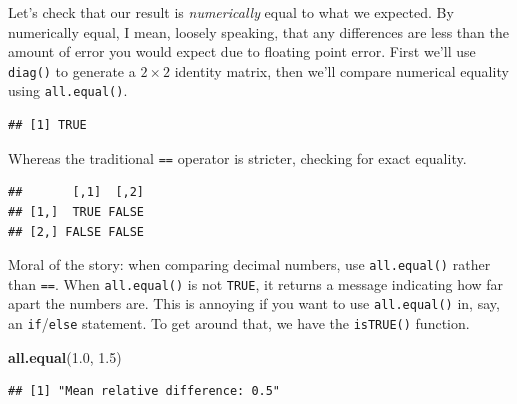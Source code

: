 \documentclass[12pt,oneside,openany]{book}
\newenvironment{Shaded}{\begin{snugshade}}{\end{snugshade}}
\newcommand{\KeywordTok}[1]{\textcolor[rgb]{0.13,0.29,0.53}{\textbf{{#1}}}}
\newcommand{\DecValTok}[1]{\textcolor[rgb]{0.00,0.00,0.81}{{#1}}}
\newcommand{\FloatTok}[1]{\textcolor[rgb]{0.00,0.00,0.81}{{#1}}}
\newcommand{\StringTok}[1]{\textcolor[rgb]{0.31,0.60,0.02}{{#1}}}
\newcommand{\NormalTok}[1]{{#1}}
\begin{document}
Let's check that our result is \emph{numerically} equal to what we
expected. By numerically equal, I mean, loosely speaking, that any
differences are less than the amount of error you would expect due to
floating point error. First we'll use \texttt{diag()} to generate a
\(2 \times 2\) identity matrix, then we'll compare numerical equality
using \texttt{all.equal()}.

\begin{Shaded}
\end{Shaded}

\begin{verbatim}
## [1] TRUE
\end{verbatim}

Whereas the traditional \texttt{==} operator is stricter, checking for
exact equality.

\begin{Shaded}
\end{Shaded}

\begin{verbatim}
##       [,1]  [,2]
## [1,]  TRUE FALSE
## [2,] FALSE FALSE
\end{verbatim}

Moral of the story: when comparing decimal numbers, use
\texttt{all.equal()} rather than \texttt{==}. When \texttt{all.equal()}
is not \texttt{TRUE}, it returns a message indicating how far apart the
numbers are. This is annoying if you want to use \texttt{all.equal()}
in, say, an \texttt{if}/\texttt{else} statement. To get around that, we
have the \texttt{isTRUE()} function.

\begin{Shaded}
\begin{Highlighting}[]
\KeywordTok{all.equal}\NormalTok{(}\FloatTok{1.0}\NormalTok{, }\FloatTok{1.5}\NormalTok{)}
\end{Highlighting}
\end{Shaded}

\begin{verbatim}
## [1] "Mean relative difference: 0.5"
\end{verbatim}
\end{document}
